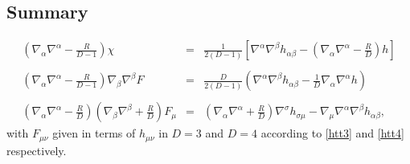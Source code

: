 \documentclass[10pt,letterpaper]{article}
\numberwithin{equation}{section}
\begin{document}
\subsection{Summary}
\begin{eqnarray}
\left( \nabla_\alpha\nabla^\alpha -\frac{R}{D-1}\right)\chi &=& \frac{1}{2(D-1)}\left[ \nabla^\alpha\nabla^\beta h_{\alpha\beta}  -\left(\nabla_\alpha\nabla^\alpha - \frac{R}{D}\right)h\right]
\\ \nonumber\\
\left(\nabla_\alpha\nabla^\alpha - \frac{R}{D-1}\right) \nabla_\beta\nabla^\beta F &=& \frac{D}{2(D-1)}\left( \nabla^\alpha\nabla^\beta h_{\alpha\beta}  - \frac{1}{D}\nabla_\alpha\nabla^\alpha h\right)
\\ \nonumber\\
\left(\nabla_\alpha\nabla^\alpha - \frac{R}{D}\right)\left(\nabla_\beta\nabla^\beta + \frac{R}{D}\right) F_\mu
&=& \left(\nabla_\alpha\nabla^\alpha+\frac{R}{D}\right)\nabla^\sigma h_{\sigma\mu} - \nabla_\mu \nabla^\alpha\nabla^\beta h_{\alpha\beta},
\end{eqnarray}
with $F_{\mu\nu}$ given in terms of $h_{\mu\nu}$ in $D=3$ and $D=4$ according to \eqref{htt3} and \eqref{htt4} respectively. 
%
%
\newpage
%
%
\end{document}

